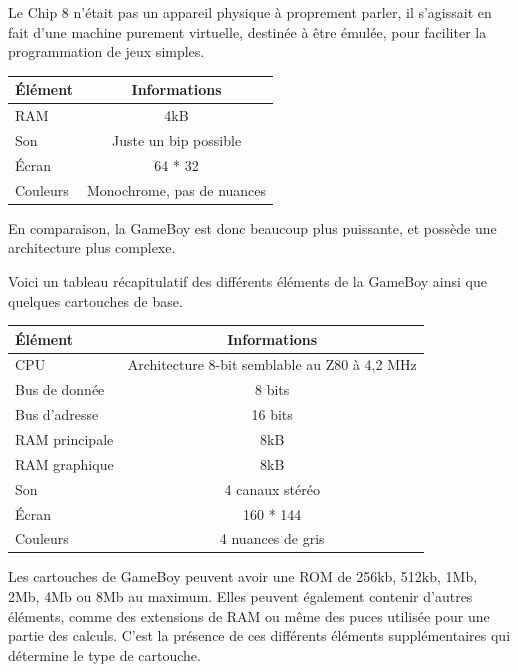 \documentclass[12pt, a4paper]{article}
\begin{document}
\bigskip
Le Chip 8 n'était pas un appareil physique à proprement parler, il s'agissait en fait d'une machine purement virtuelle, destinée à être émulée, pour faciliter la programmation de jeux simples.

\bigskip
\bigskip
\begin{center}
\begin{tabular}{|l|c|}
\hline
\bf Élément          & \bf Informations \\
\hline
RAM & 4kB\\
\hline 
Son & Juste un bip possible\\
\hline
Écran & 64 * 32\\
\hline
Couleurs & Monochrome, pas de nuances\\
\hline
\end{tabular}
\end{center}

\bigskip
\bigskip
\pagebreak
En comparaison, la GameBoy est donc beaucoup plus puissante, et possède une architecture plus complexe.

Voici un tableau récapitulatif des différents éléments de la GameBoy ainsi que quelques cartouches de base. 

\bigskip
\begin{center}
\begin{tabular}{|l|c|}
\hline
\bf Élément          & \bf Informations \\
\hline
CPU & Architecture 8-bit semblable au Z80 à 4,2 MHz\\
\hline
Bus de donnée & 8 bits\\
\hline
Bus d'adresse & 16 bits\\
\hline
RAM principale & 8kB\\
\hline
RAM graphique & 8kB\\
\hline 
Son & 4 canaux stéréo\\
\hline
Écran & 160 * 144\\
\hline
Couleurs & 4 nuances de gris\\
\hline
\end{tabular}
\end{center}

\bigskip
Les cartouches de GameBoy peuvent avoir une ROM de 256kb, 512kb, 1Mb, 2Mb, 4Mb ou 8Mb au maximum. Elles peuvent également contenir d'autres éléments, comme des extensions de RAM ou même des puces utilisée pour une partie des calculs. C'est la présence de ces différents éléments supplémentaires qui détermine le type de cartouche.

\pagebreak
\end{document}
